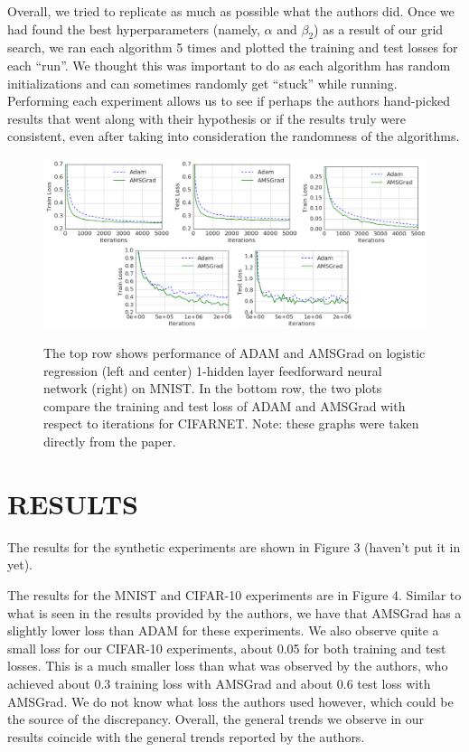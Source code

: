 \documentclass[letterpaper, 10 pt, conference]{ieeeconf}  %
\begin{document}
Overall, we tried to replicate as much as possible what the authors did. Once we had found the best hyperparameters (namely, $\alpha$ and $\beta_{2}$) as a result of our grid search, we ran each algorithm 5 times and plotted the training and test losses for each ``run''. We thought this was important to do as each algorithm has random initializations and can sometimes randomly get ``stuck'' while running. Performing each experiment allows us to see if perhaps the authors hand-picked results that went along with their hypothesis or if the results truly were consistent, even after taking into consideration the randomness of the algorithms. 
    
\begin{figure}[]
\centering
\begin{minipage}{0.9\textwidth}
  \centering
  \includegraphics[width=1\linewidth]{OG_results_nets.png}
  \label{fig:test2}
\end{minipage}%
\caption[]{The top row shows performance of ADAM and AMSGrad on logistic regression (left and center) 1-hidden layer feedforward neural network (right) on MNIST. In the bottom row, the two plots compare the training and test loss of ADAM and AMSGrad with respect to iterations for CIFARNET. Note: these graphs were taken directly from the paper.} 
\end{figure}    
    
\section{RESULTS}
The results for the synthetic experiments are shown in Figure 3 (haven't put it in yet). \par
The results for the MNIST and CIFAR-10 experiments are in Figure 4. Similar to what is seen in the results provided by the authors, we have that AMSGrad has a slightly lower loss than ADAM for these experiments. We also observe quite a small loss for our CIFAR-10 experiments, about 0.05 for both training and test losses. This is a much smaller loss than what was observed by the authors, who achieved about 0.3 training loss with AMSGrad and about 0.6 test loss with AMSGrad. We do not know what loss the authors used however, which could be the source of the discrepancy. Overall, the general trends we observe in our results coincide with the general trends reported by the authors. 
\end{document}
